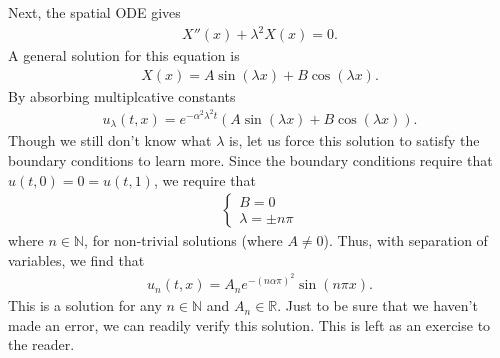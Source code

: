 \documentclass{article}
\theoremstyle{definition}
\newcommand{\R}{\mathbb{R}}
\begin{document}
Next, the spatial ODE gives
\begin{align*}
X''(x) + \lambda^2 X(x) = 0.
\end{align*}
A general solution for this equation is
\begin{align*}
X(x) = A\sin(\lambda x) + B\cos(\lambda x).
\end{align*}
By absorbing multiplcative constants
\begin{align*}
u_\lambda(t,x) = e^{-\alpha^2\lambda^2 t}\left(A\sin(\lambda x) + B\cos(\lambda x) \right).
\end{align*}
Though we still don't know what $\lambda$ is, let us force this solution to satisfy the boundary conditions to learn more. Since the boundary conditions require that $u(t,0)=0=u(t,1)$, we require that
\begin{align*}
\begin{cases}
B=0\\
\lambda = \pm n\pi
\end{cases}
\end{align*}
where $n\in \mathbb{N}$, for non-trivial solutions (where $A\neq 0$). Thus, with separation of variables, we find that
\begin{align*}
u_n(t,x) = A_ne^{-(n\alpha\pi)^2}\sin(n\pi x).
\end{align*}
This is a solution for any $n\in \mathbb{N}$ and $A_n\in\R$. Just to be sure that we haven't made an error, we can readily verify this solution. This is left as an exercise to the reader. \\
\end{document}
